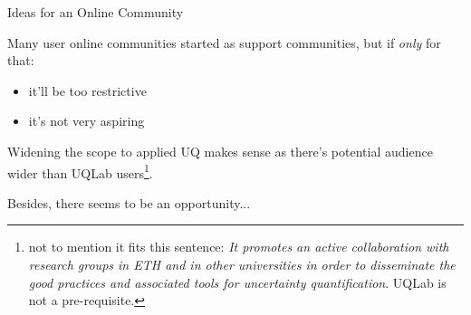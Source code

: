 \documentclass[]{rsuqbeamernew}
\begin{document}
\begin{frame}[t]{Ideas for an Online Community}

Many user online communities started as support communities, but if \emph{only} for that:
\begin{itemize}
  \item it'll be too restrictive %
  \item it's not very aspiring
\end{itemize}

\vspace{0.3cm}

Widening the scope to applied UQ makes sense as there's potential audience wider than UQLab users\footnote{not to mention it fits this sentence: \emph{It promotes an active collaboration with research groups in ETH and in other universities in order to disseminate the good practices and associated tools for uncertainty quantification}. UQLab is not a pre-requisite.}.
\vspace{0.3cm}

Besides, there seems to be an opportunity...

\end{frame}
\end{document}

